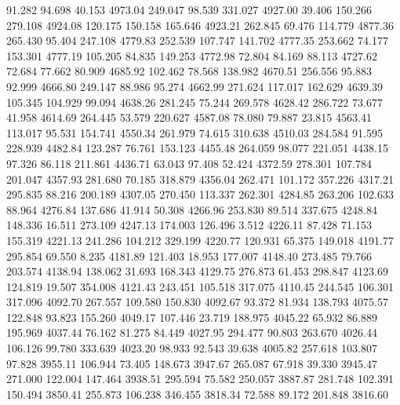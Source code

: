   91.282   94.698   40.153      4973.04
 249.047   98.539  331.027      4927.00
  39.406  150.266  279.108      4924.08
 120.175  150.158  165.646      4923.21
 262.845   69.476  114.779      4877.36
 265.430   95.404  247.108      4779.83
 252.539  107.747  141.702      4777.35
 253.662   74.177  153.301      4777.19
 105.205   84.835  149.253      4772.98
  72.804   84.169   88.113      4727.62
  72.684   77.662   80.909      4685.92
 102.462   78.568  138.982      4670.51
 256.556   95.883   92.999      4666.80
 249.147   88.986   95.274      4662.99
 271.624  117.017  162.629      4639.39
 105.345  104.929   99.094      4638.26
 281.245   75.244  269.578      4628.42
 286.722   73.677   41.958      4614.69
 264.445   53.579  220.627      4587.08
  78.080   79.887   23.815      4563.41
 113.017   95.531  154.741      4550.34
 261.979   74.615  310.638      4510.03
 284.584   91.595  228.939      4482.84
 123.287   76.761  153.123      4455.48
 264.059   98.077  221.051      4438.15
  97.326   86.118  211.861      4436.71
  63.043   97.408   52.424      4372.59
 278.301  107.784  201.047      4357.93
 281.680   70.185  318.879      4356.04
 262.471  101.172  357.226      4317.21
 295.835   88.216  200.189      4307.05
 270.450  113.337  262.301      4284.85
 263.206  102.633   88.964      4276.84
 137.686   41.914   50.308      4266.96
 253.830   89.514  337.675      4248.84
 148.336   16.511  273.109      4247.13
 174.003  126.496    3.512      4226.11
  87.428   71.153  155.319      4221.13
 241.286  104.212  329.199      4220.77
 120.931   65.375  149.018      4191.77
 295.854   69.550    8.235      4181.89
 121.403   18.953  177.007      4148.40
 273.485   79.766  203.574      4138.94
 138.062   31.693  168.343      4129.75
 276.873   61.453  298.847      4123.69
 124.819   19.507  354.008      4121.43
 243.451  105.518  317.075      4110.45
 244.545  106.301  317.096      4092.70
 267.557  109.580  150.830      4092.67
  93.372   81.934  138.793      4075.57
 122.848   93.823  155.260      4049.17
 107.446   23.719  188.975      4045.22
  65.932   86.889  195.969      4037.44
  76.162   81.275   84.449      4027.95
 294.477   90.803  263.670      4026.44
 106.126   99.780  333.639      4023.20
  98.933   92.543   39.638      4005.82
 257.618  103.807   97.828      3955.11
 106.944   73.405  148.673      3947.67
 265.087   67.918   39.330      3945.47
 271.000  122.004  147.464      3938.51
 295.594   75.582  250.057      3887.87
 281.748  102.391  150.494      3850.41
 255.873  106.238  346.455      3818.34
  72.588   89.172  201.848      3816.60
